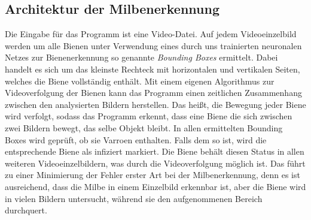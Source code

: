 \documentclass[11pt,a4paper]{article}
\begin{document}
\subsection{Architektur der Milbenerkennung}
Die Eingabe für das Programm ist eine Video-Datei. Auf jedem Videoeinzelbild werden um alle Bienen unter Verwendung eines durch uns trainierten neuronalen Netzes zur Bienenerkennung so genannte \textit{Bounding Boxes} ermittelt. Dabei handelt es sich um das kleinste Rechteck mit horizontalen und vertikalen Seiten, welches die Biene vollständig enthält. Mit einem eigenen Algorithmus zur Videoverfolgung der Bienen kann das Programm einen zeitlichen Zusammenhang zwischen den analysierten Bildern herstellen. Das heißt, die Bewegung jeder Biene wird verfolgt, sodass das Programm erkennt, dass eine Biene die sich zwischen zwei Bildern bewegt, das selbe Objekt bleibt. In allen ermittelten Bounding Boxes wird geprüft, ob sie Varroen enthalten. Falls dem so ist, wird die entsprechende Biene als infiziert markiert. Die Biene behält diesen Status in allen weiteren Videoeinzelbildern, was durch die Videoverfolgung möglich ist. Das führt zu einer Minimierung der Fehler erster Art bei der Milbenerkennung, denn es ist ausreichend, dass die Milbe in einem Einzelbild erkennbar ist, aber die Biene wird in vielen Bildern untersucht, während sie den aufgenommenen Bereich durchquert.
\end{document}
